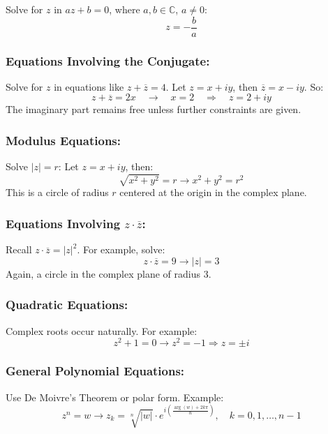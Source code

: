 Solve for \( z \) in \( az + b = 0 \), where \( a, b \in \mathbb{C} \), \( a \neq 0 \):
	      \[
		      z = -\frac{b}{a}
	      \]

\subsubsection*{Equations Involving the Conjugate:}

Solve for \( z \) in equations like \( z + \overline{z} = 4 \).
	      Let \( z = x + iy \), then \( \overline{z} = x - iy \). So:
	      \[
		      z + \overline{z} = 2x \quad \to \quad x = 2 \quad \Rightarrow \quad z = 2 + iy
	      \]
	      The imaginary part remains free unless further constraints are given.

\subsubsection*{Modulus Equations:}

Solve \( |z| = r \):
	      Let \( z = x + iy \), then:
	      \[
		      \sqrt{x^2 + y^2} = r \to x^2 + y^2 = r^2
	      \]
	      This is a circle of radius \( r \) centered at the origin in the complex plane.

\subsubsection*{Equations Involving \( z \cdot \overline{z} \):}

Recall \( z \cdot \overline{z} = |z|^2 \).
	      For example, solve:
	      \[
		      z \cdot \overline{z} = 9 \to |z| = 3
	      \]
	      Again, a circle in the complex plane of radius 3.

\subsubsection*{Quadratic Equations:}

Complex roots occur naturally. For example:
	      \[
		      z^2 + 1 = 0 \to z^2 = -1 \Rightarrow z = \pm i
	      \]

 \subsubsection*{General Polynomial Equations:}

 Use De Moivre’s Theorem or polar form. Example:
	      \[
		      z^n = w \to z_k = \sqrt[n]{|w|} \cdot e^{i\left( \frac{\arg(w) + 2k\pi}{n} \right)}, \quad k = 0, 1, \dots, n-1
	      \]


